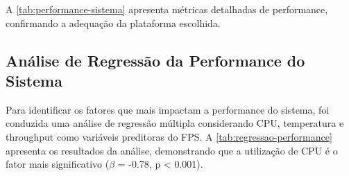 A \autoref{tab:performance-sistema} apresenta métricas detalhadas de performance, confirmando a adequação da plataforma escolhida.

\begin{table}[!ht]
\captionsetup{width=16cm}
\end{table}

\subsection{Análise de Regressão da Performance do Sistema}
\label{subsec:regressao-performance}

Para identificar os fatores que mais impactam a performance do sistema, foi conduzida uma análise de regressão múltipla considerando CPU, temperatura e throughput como variáveis preditoras do FPS. A \autoref{tab:regressao-performance} apresenta os resultados da análise, demonstrando que a utilização de CPU é o fator mais significativo ($ \beta $ = -0.78, p < 0.001).

